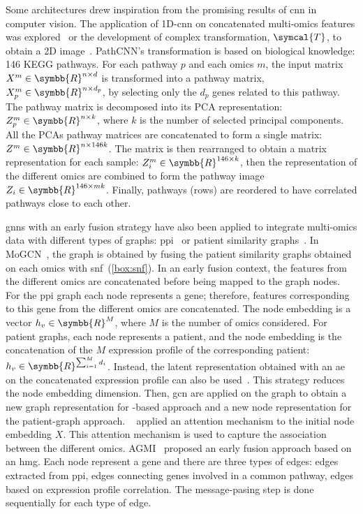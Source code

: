 \documentclass[../main.tex]{subfiles}
\begin{document}
		Some architectures drew inspiration from the promising results of \gls{cnn} in computer vision.
		The application of 1D-\gls{cnn} on concatenated multi-omics features was explored~\cite{CNN1D} or the development of complex transformation, \(\symcal{T}\), to obtain a 2D image~\cite{PathCNN}.
		PathCNN's transformation is based on biological knowledge: 146 KEGG pathways.
		For each pathway \(p\) and each omics \(m\), the input matrix \(X^{m} \in \symbb{R}^{n \times d}\) is transformed into a pathway matrix, \(X_{p}^{m} \in \symbb{R}^{n \times d_{p}}\), by selecting only the \(d_{p}\) genes related to this pathway.
		The pathway matrix is decomposed into its PCA representation: \(Z_{p}^{m} \in \symbb{R}^{n \times k}\), where \(k\) is the number of selected principal components.
		All the PCAs pathway matrices are concatenated to form a single matrix: \(Z^{m} \in \symbb{R}^{n \times 146k}\).
		The matrix is then rearranged to obtain a matrix representation for each sample: \(Z_{i}^{m} \in \symbb{R}^{146 \times k}\), then the representation of the different omics are combined to form the pathway image \(Z_{i} \in \symbb{R}^{146 \times mk}\).
		Finally, pathways (\ie{}rows) are reordered to have correlated pathways close to each other.

		\Glspl{gnn} with an early fusion strategy have also been applied to integrate multi-omics data with different types of graphs: \gls{ppi}~\cite{Althubaiti_2021,Guo2023} or patient similarity graphs~\cite{MoGCN}.
		In MoGCN~\cite{MoGCN}, the graph is obtained by fusing the patient similarity graphs obtained on each omics with \gls{snf}~(\cref{box:snf}).
		In an early fusion context, the features from the different omics are concatenated before being mapped to the graph nodes.
		For the \gls{ppi} graph each node represents a gene; therefore, features corresponding to this gene from the different omics are concatenated.
		The node embedding is a vector \(h_{v} \in \symbb{R}^{M}\), where \(M\) is the number of omics considered.
		For patient graphs, each node represents a patient, and the node embedding is the concatenation of the \(M\) expression profile of the corresponding patient: \(h_{v} \in \symbb{R}^{\sum_{i=1}^{M}d_i}\).
		Instead, the latent representation obtained with an \gls{ae} on the concatenated expression profile can also be used~\cite{MoGCN}.
		This strategy reduces the node embedding dimension.
		Then, \gls{gcn} are applied on the graph to obtain a new graph representation for -based approach and a new node representation for the patient-graph approach.
		\citeauthor{Guo2023}~\cite{Guo2023} applied an attention mechanism to the initial node embedding \(X\).
		This attention mechanism is used to capture the association between the different omics.
		AGMI~\cite{AGMI} proposed an early fusion approach based on an \gls{hmg}.
		Each node represent a gene and there are three types of edges: edges extracted from \gls{ppi}, edges connecting genes involved in a common pathway, edges based on expression profile correlation.
		The message-pasing step is done sequentially for each type of edge.
\end{document}
